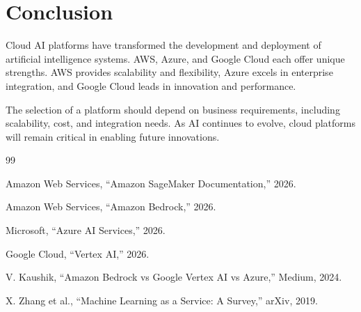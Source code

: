 \documentclass[conference]{IEEEtran}
\begin{document}
	\section{Conclusion}
	Cloud AI platforms have transformed the development and deployment of artificial intelligence systems. AWS, Azure, and Google Cloud each offer unique strengths. AWS provides scalability and flexibility, Azure excels in enterprise integration, and Google Cloud leads in innovation and performance.
	
	The selection of a platform should depend on business requirements, including scalability, cost, and integration needs. As AI continues to evolve, cloud platforms will remain critical in enabling future innovations.
	
	\begin{thebibliography}{99}
		
		Amazon Web Services, ``Amazon SageMaker Documentation,'' 2026.
		
		Amazon Web Services, ``Amazon Bedrock,'' 2026.
		
		Microsoft, ``Azure AI Services,'' 2026.
		
		Google Cloud, ``Vertex AI,'' 2026.
		
		V. Kaushik, ``Amazon Bedrock vs Google Vertex AI vs Azure,'' Medium, 2024.
		
		X. Zhang et al., ``Machine Learning as a Service: A Survey,'' arXiv, 2019.
		
	\end{thebibliography}
	
\end{document}
